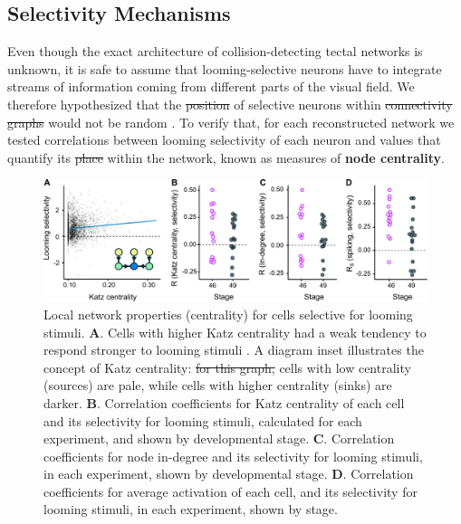 \documentclass{article}
\providecommand{\DIFaddtex}[1]{{\protect\color{blue}{#1}}} %
\providecommand{\DIFdeltex}[1]{{\protect\color{red}\sout{#1}}}                      %
\providecommand{\DIFaddbegin}{} %
\providecommand{\DIFaddend}{} %
\providecommand{\DIFdelbegin}{} %
\providecommand{\DIFdelend}{} %
\providecommand{\DIFaddFL}[1]{\DIFadd{#1}} %
\providecommand{\DIFdelFL}[1]{\DIFdel{#1}} %
\providecommand{\DIFaddbeginFL}{} %
\providecommand{\DIFaddendFL}{} %
\providecommand{\DIFdelbeginFL}{} %
\providecommand{\DIFdelendFL}{} %
\providecommand{\DIFadd}[1]{\texorpdfstring{\DIFaddtex{#1}}{#1}} %
\providecommand{\DIFdel}[1]{\texorpdfstring{\DIFdeltex{#1}}{}} %
\newcommand{\DIFscaledelfig}{0.5}
\newlength{\DIFdelgraphicswidth} %
\newlength{\DIFdelgraphicsheight} %
\newcommand{\DIFaddincludegraphics}[2][]{{\color{blue}\fbox{\DIFOincludegraphics[#1]{#2}}}} %
\newcommand{\DIFdelincludegraphics}[2][]{%
\sbox{\DIFdelgraphicsbox}{\DIFOincludegraphics[#1]{#2}}%
\settoboxwidth{\DIFdelgraphicswidth}{\DIFdelgraphicsbox} %
\settoboxtotalheight{\DIFdelgraphicsheight}{\DIFdelgraphicsbox} %
\scalebox{\DIFscaledelfig}{%
\parbox[b]{\DIFdelgraphicswidth}{\usebox{\DIFdelgraphicsbox}\\[-\baselineskip] \rule{\DIFdelgraphicswidth}{0em}}\llap{\resizebox{\DIFdelgraphicswidth}{\DIFdelgraphicsheight}{%
\setlength{\unitlength}{\DIFdelgraphicswidth}%
\begin{picture}(1,1)%
\thicklines\linethickness{2pt} %
{\color[rgb]{1,0,0}\put(0,0){\framebox(1,1){}}}%
{\color[rgb]{1,0,0}\put(0,0){\line( 1,1){1}}}%
{\color[rgb]{1,0,0}\put(0,1){\line(1,-1){1}}}%
\end{picture}%
}\hspace*{3pt}}} %
} %
\DeclareRobustCommand{\DIFaddbegin}{\DIFOaddbegin \let\includegraphics\DIFaddincludegraphics} %
\DeclareRobustCommand{\DIFaddend}{\DIFOaddend \let\includegraphics\DIFOincludegraphics} %
\DeclareRobustCommand{\DIFdelbegin}{\DIFOdelbegin \let\includegraphics\DIFdelincludegraphics} %
\DeclareRobustCommand{\DIFdelend}{\DIFOaddend \let\includegraphics\DIFOincludegraphics} %
\DeclareRobustCommand{\DIFaddbeginFL}{\DIFOaddbeginFL \let\includegraphics\DIFaddincludegraphics} %
\DeclareRobustCommand{\DIFaddendFL}{\DIFOaddendFL \let\includegraphics\DIFOincludegraphics} %
\DeclareRobustCommand{\DIFdelbeginFL}{\DIFOdelbeginFL \let\includegraphics\DIFdelincludegraphics} %
\DeclareRobustCommand{\DIFdelendFL}{\DIFOaddendFL \let\includegraphics\DIFOincludegraphics} %
\begin{document}
\subsection*{Selectivity Mechanisms}

Even though the exact architecture of collision-detecting tectal networks is unknown, it is safe to assume that looming-selective neurons have to integrate streams of information coming from different parts of the visual field. We therefore hypothesized that the \DIFdelbegin \DIFdel{position }\DIFdelend \DIFaddbegin \DIFadd{topological placement }\DIFaddend of selective neurons within \DIFdelbegin \DIFdel{connectivity graphs }\DIFdelend \DIFaddbegin \DIFadd{each connectivity graph }\DIFaddend would not be random \citep{timme2016degree}. To verify that, for each reconstructed network we tested correlations between looming selectivity of each neuron and values that quantify its \DIFdelbegin \DIFdel{place }\DIFdelend \DIFaddbegin \DIFadd{placement }\DIFaddend within the network, known as measures of \textbf{node centrality}.

\begin{figure}[t!]
\includegraphics[width=\linewidth]{fig6.pdf}
\caption{
Local network properties (centrality) for cells selective for looming stimuli. \textbf{A}. Cells with higher Katz centrality had a weak tendency to respond stronger to looming stimuli \DIFaddbeginFL \DIFaddFL{($r =$ 0.02, $p_{r} =$ 1e-6)}\DIFaddendFL . A diagram inset illustrates the concept of Katz centrality: \DIFdelbeginFL \DIFdelFL{for this graph, }\DIFdelendFL cells with low centrality (sources) are pale, while cells with higher centrality (sinks) are darker. \textbf{B}. Correlation coefficients for Katz centrality of each cell and its selectivity for looming stimuli, calculated for each experiment, and shown by developmental stage. \textbf{C}. Correlation coefficients for node in-degree and its selectivity for looming stimuli, in each experiment, shown by developmental stage. \textbf{D}. Correlation coefficients for average activation of each cell, and its selectivity for looming stimuli, in each experiment, shown by stage. }
\end{figure}
\end{document}

